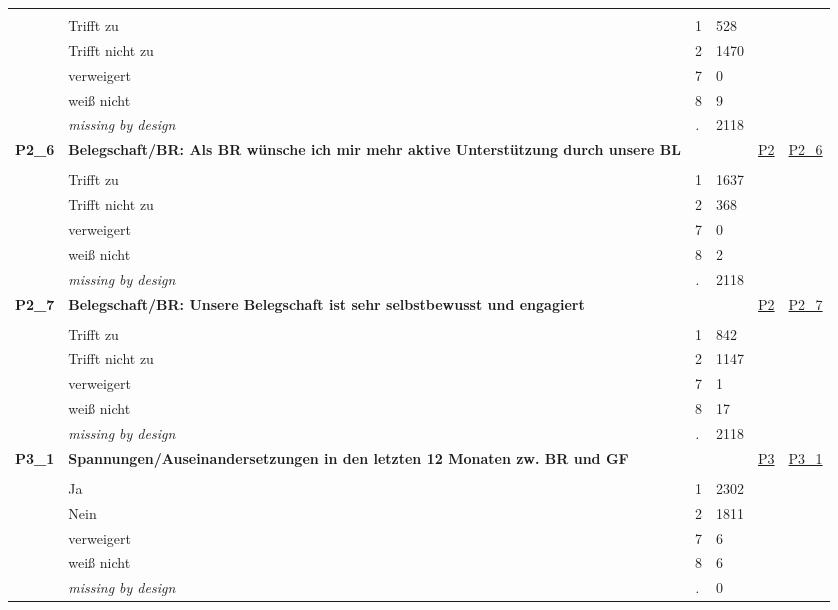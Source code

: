 \begin{longtable}{| L{2.45cm} | L{6cm} | C{1.5cm} | R{1cm} | C{2.25cm} | C{2.25cm} |}
   &  &  &  &  &  \\ 
   & Trifft zu & 1 & 528 &  &  \\ 
   & Trifft nicht zu & 2 & 1470 &  &  \\ 
   & verweigert & 7 & 0 &  &  \\ 
   & weiß nicht & 8 & 9 &  &  \\ 
   & \textit{missing by design} & \textit{.} & 2118 &  &  \\ 
   \midrule
\textbf{P2\_6}\label{var:P2:6} & \textbf{Belegschaft/BR: Als BR wünsche ich mir mehr aktive Unterstützung durch unsere BL} &  &  & \hyperref[P2]{P2} & \hyperref[var:suf:P2:6]{P2\_6} \\ 
   &  &  &  &  &  \\ 
   & Trifft zu & 1 & 1637 &  &  \\ 
   & Trifft nicht zu & 2 & 368 &  &  \\ 
   & verweigert & 7 & 0 &  &  \\ 
   & weiß nicht & 8 & 2 &  &  \\ 
   & \textit{missing by design} & \textit{.} & 2118 &  &  \\ 
   \midrule
\textbf{P2\_7}\label{var:P2:7} & \textbf{Belegschaft/BR: Unsere Belegschaft ist sehr selbstbewusst und engagiert} &  &  & \hyperref[P2]{P2} & \hyperref[var:suf:P2:7]{P2\_7} \\ 
   &  &  &  &  &  \\ 
   & Trifft zu & 1 & 842 &  &  \\ 
   & Trifft nicht zu & 2 & 1147 &  &  \\ 
   & verweigert & 7 & 1 &  &  \\ 
   & weiß nicht & 8 & 17 &  &  \\ 
   & \textit{missing by design} & \textit{.} & 2118 &  &  \\ 
   \midrule
\textbf{P3\_1}\label{var:P3:1} & \textbf{Spannungen/Auseinandersetzungen in den letzten 12 Monaten zw. BR und GF} &  &  & \hyperref[P3]{P3} & \hyperref[var:suf:P3:1]{P3\_1} \\ 
   &  &  &  &  &  \\ 
   & Ja & 1 & 2302 &  &  \\ 
   & Nein & 2 & 1811 &  &  \\ 
   & verweigert & 7 & 6 &  &  \\ 
   & weiß nicht & 8 & 6 &  &  \\ 
   & \textit{missing by design} & \textit{.} & 0 &  &  \\ 
   \midrule

\end{longtable}
